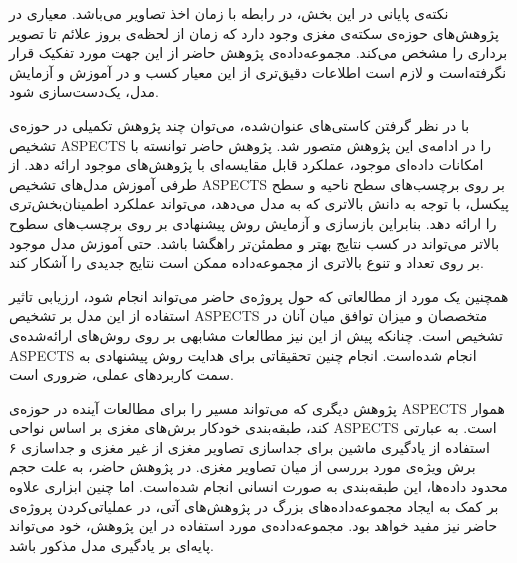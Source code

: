 نکته‌ی پایانی در این بخش، در رابطه با زمان اخذ تصاویر می‌باشد.
معیاری در پژوهش‌های حوزه‌ی سکته‌ی مغزی وجود دارد که زمان از لحظه‌ی بروز علائم تا تصویر برداری را مشخص می‌کند.
مجموعه‌داده‌ی پژوهش حاضر از این جهت مورد تفکیک قرار نگرفته‌است و لازم است اطلاعات دقیق‌تری از این معیار کسب و در آموزش و آزمایش مدل، یک‌دست‌سازی شود.


با در نظر گرفتن کاستی‌های عنوان‌شده، می‌توان چند پژوهش تکمیلی در حوزه‌ی تشخیص ASPECTS را در ادامه‌ی این پژوهش متصور شد.
پژوهش حاضر توانسته با امکانات داده‌ای موجود، عملکرد قابل مقایسه‌ای با پژوهش‌های موجود ارائه دهد.
از طرفی
آموزش مدل‌های تشخیص ASPECTS بر روی برچسب‌های سطح ناحیه و سطح پیکسل، با توجه به دانش بالاتری که به مدل می‌دهد، می‌تواند عملکرد اطمینان‌بخش‌تری را ارائه دهد.
بنابراین بازسازی و آزمایش روش پیشنهادی بر روی برچسب‌های سطوح بالاتر می‌تواند در کسب نتایج بهتر و مطمئن‌تر راهگشا باشد.
حتی آموزش مدل موجود بر روی تعداد و تنوع بالاتری از مجموعه‌داده ممکن است نتایج جدیدی را آشکار کند.

همچنین یک مورد از مطالعاتی که حول پروژه‌ی حاضر می‌تواند انجام شود، ارزیابی تاثیر استفاده از این مدل بر تشخیص ASPECTS متخصصان و 
میزان توافق میان آنان در تشخیص است.
چنانکه پیش از این نیز مطالعات مشابهی بر روی روش‌های ارائه‌شده‌ی ASPECTS انجام شده‌است.
انجام چنین تحقیقاتی برای هدایت روش پیشنهادی به سمت کاربرد‌های عملی، ضروری است.

پژوهش دیگری که می‌تواند مسیر را برای مطالعات آینده در حوزه‌ی ASPECTS هموار کند، 
طبقه‌بندی خودکار برش‌های مغزی بر اساس نواحی ASPECTS است.
به عبارتی استفاده از یادگیری ماشین برای جداسازی تصاویر مغزی از غیر مغزی و جداسازی ۶ برش ویژه‌ی مورد بررسی از میان تصاویر مغزی.
در پژوهش حاضر، به علت حجم محدود داد‌ه‌ها، این طبقه‌بندی به صورت انسانی انجام شده‌است.
اما چنین ابزاری علاوه بر 
کمک به ایجاد مجموعه‌داده‌های بزرگ در پژوهش‌های آتی، در عملیاتی‌کردن پروژه‌ی حاضر نیز مفید خواهد بود.
مجموعه‌داده‌ی مورد استفاده در این پژوهش، خود می‌تواند پایه‌ای بر یادگیری مدل مذکور باشد.

